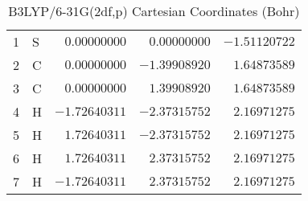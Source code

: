 \documentclass[10pt,oneside]{article}
\begin{document}
\begin{table}[h!]
\centering
\caption{B3LYP/6-31G(2df,p) Cartesian Coordinates (Bohr)}
\begin{tabular}{llrrr}
1  & S  & $ 0.00000000$ & $ 0.00000000$ & $-1.51120722$ \\
2  & C  & $ 0.00000000$ & $-1.39908920$ & $ 1.64873589$ \\
3  & C  & $ 0.00000000$ & $ 1.39908920$ & $ 1.64873589$ \\
4  & H  & $-1.72640311$ & $-2.37315752$ & $ 2.16971275$ \\
5  & H  & $ 1.72640311$ & $-2.37315752$ & $ 2.16971275$ \\
6  & H  & $ 1.72640311$ & $ 2.37315752$ & $ 2.16971275$ \\
7  & H  & $-1.72640311$ & $ 2.37315752$ & $ 2.16971275$ \\
\end{tabular}
\end{table}

\clearpage
\end{document}
